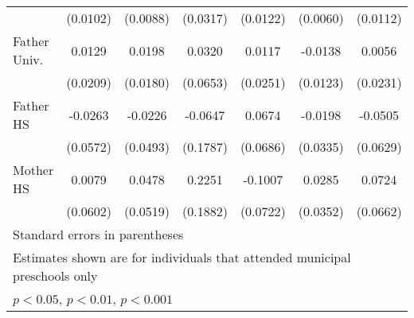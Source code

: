 \documentclass{article}
\begin{document}
\begin{table}[htbp]
\begin{tabular}{l*{6}{c}}
            &    (0.0102)         &    (0.0088)         &    (0.0317)         &    (0.0122)         &    (0.0060)         &    (0.0112)         \\
\addlinespace
Father Univ.&      0.0129         &      0.0198         &      0.0320         &      0.0117         &     -0.0138         &      0.0056         \\
            &    (0.0209)         &    (0.0180)         &    (0.0653)         &    (0.0251)         &    (0.0123)         &    (0.0231)         \\
\addlinespace
Father HS   &     -0.0263         &     -0.0226         &     -0.0647         &      0.0674         &     -0.0198         &     -0.0505         \\
            &    (0.0572)         &    (0.0493)         &    (0.1787)         &    (0.0686)         &    (0.0335)         &    (0.0629)         \\
\addlinespace
Mother HS   &      0.0079         &      0.0478         &      0.2251         &     -0.1007         &      0.0285         &      0.0724         \\
            &    (0.0602)         &    (0.0519)         &    (0.1882)         &    (0.0722)         &    (0.0352)         &    (0.0662)         \\
\bottomrule
\multicolumn{7}{l}{\footnotesize Standard errors in parentheses}\\
\multicolumn{7}{l}{\footnotesize Estimates shown are for individuals that attended municipal preschools only}\\
\multicolumn{7}{l}{\footnotesize \sym{*} \(p<0.05\), \sym{**} \(p<0.01\), \sym{***} \(p<0.001\)}\\
\end{tabular}
\end{table}
\end{document}
